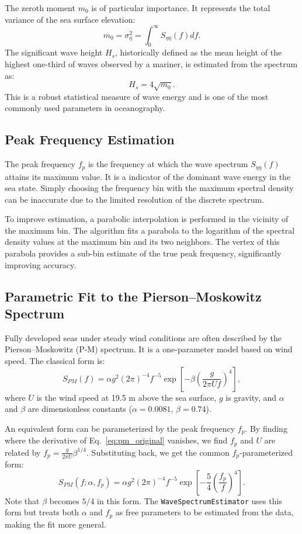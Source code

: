 \documentclass[11pt,letterpaper]{article}
\begin{document}
The zeroth moment $m_0$ is of particular importance. It represents the total variance of the sea surface elevation:
\begin{equation}
m_0 = \sigma_\eta^2 = \int_{0}^{\infty} S_{\eta\eta}(f)  df.
\end{equation}
The significant wave height $H_s$, historically defined as the mean height of the highest one-third of waves observed by a mariner, is estimated from the spectrum as:
\begin{equation}
H_s = 4\sqrt{m_0}.
\end{equation}
This is a robust statistical measure of wave energy and is one of the most commonly used parameters in oceanography.

\subsection{Peak Frequency Estimation}
The peak frequency $f_p$ is the frequency at which the wave spectrum $S_{\eta\eta}(f)$ attains its maximum value. It is a indicator of the dominant wave energy in the sea state. Simply choosing the frequency bin with the maximum spectral density can be inaccurate due to the limited resolution of the discrete spectrum.

To improve estimation, a parabolic interpolation is performed in the vicinity of the maximum bin. The algorithm fits a parabola to the logarithm of the spectral density values at the maximum bin and its two neighbors. The vertex of this parabola provides a sub-bin estimate of the true peak frequency, significantly improving accuracy.

\subsection{Parametric Fit to the Pierson--Moskowitz Spectrum}
\label{subsec:pmfit}
Fully developed seas under steady wind conditions are often described by the Pierson--Moskowitz (P-M) spectrum. It is a one-parameter model based on wind speed. The classical form is:
\begin{equation}
\label{eq:pm_original}
S_{PM}(f) = \alpha g^2 (2\pi)^{-4} f^{-5} \exp\left[-\beta\left(\frac{g}{2\pi U f}\right)^4\right],
\end{equation}
where $U$ is the wind speed at 19.5 m above the sea surface, $g$ is gravity, and $\alpha$ and $\beta$ are dimensionless constants ($\alpha=0.0081$, $\beta=0.74$).

An equivalent form can be parameterized by the peak frequency $f_p$. By finding where the derivative of Eq.~\ref{eq:pm_original} vanishes, we find $f_p$ and $U$ are related by $f_p = \frac{g}{2\pi U} \beta^{1/4}$. Substituting back, we get the common $f_p$-parameterized form:
\begin{equation}
\label{eq:pm_fp}
S_{PM}(f;\alpha, f_p) = \alpha g^2 (2\pi)^{-4} f^{-5} \exp\left[-\frac{5}{4}\left(\frac{f_p}{f}\right)^4\right].
\end{equation}
Note that $\beta$ becomes $5/4$ in this form. The \texttt{WaveSpectrumEstimator} uses this form but treats both $\alpha$ and $f_p$ as free parameters to be estimated from the data, making the fit more general.
\end{document}
